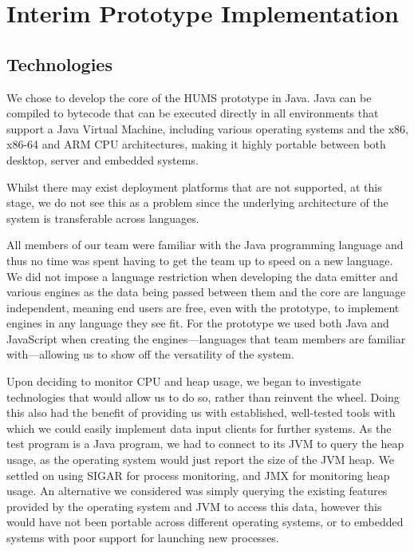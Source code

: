 \documentclass[10pt,a4paper]{article}
\begin{document}
\section{Interim Prototype Implementation}

\subsection{Technologies}

We chose to develop the core of the HUMS prototype in Java. Java can
be compiled to bytecode that can be executed directly in all
environments that support a Java Virtual Machine, including various
operating systems and the x86, x86-64 and ARM CPU architectures,
making it highly portable between both desktop, server and embedded
systems. %

Whilst there may exist deployment platforms that are not supported, at
this stage, we do not see this as a problem since the underlying
architecture of the system is transferable across languages.

All members of our team were familiar with the Java programming
language and thus no time was spent having to get the team up to speed
on a new language. We did not impose a language restriction when
developing the data emitter and various engines as the data being
passed between them and the core are language independent, meaning 
end users are free, even with the prototype, to implement engines in any
language they see fit. For the prototype we used both Java and
JavaScript when creating the engines---languages that team members are
familiar with---allowing us to show off the versatility of the system.

Upon deciding to monitor CPU and heap usage, we began to investigate
technologies that would allow us to do so, rather than reinvent the wheel.
Doing this also had the benefit of providing us with established, well-tested
tools with which we could easily implement data input clients for further
systems. As the test program is a Java program, we had to connect to its 
JVM to query the heap usage, as the operating system would just report the 
size of the JVM heap. We settled on using SIGAR for process monitoring, 
and JMX for monitoring heap usage. An alternative we considered was 
simply querying the existing features provided by the operating system 
and JVM to access this data, however this would have not been portable 
across different operating systems, or to embedded systems with poor 
support for launching new processes.
\end{document}
